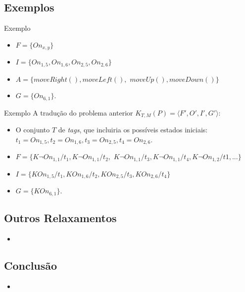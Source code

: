 \subsection{Exemplos}
\begin{frame}{Exemplo}
    \begin{multicols}{2}
        \centering
        
    \columnbreak
        \begin{itemize}
        \item $F = \lbrace On_{x,y} \rbrace$
        \item $I=\lbrace On_{1,5}, On_{1,6}, On_{2,5}, On_{2,6} \rbrace$
        \item $A=\lbrace moveRight(), moveLeft(),$ $moveUp(), moveDown() 
\rbrace$
        \item $G=\lbrace On_{6,1}\rbrace$.
        \end{itemize} 
    \end{multicols}
\end{frame}

\begin{frame}{Exemplo}
    A tradução do problema anterior $K_{T,M}(P) = \langle F', O', I', 
G'\rangle$:
    \begin{itemize}
    \item O conjunto $T$ de \textit{tags}, que incluiria os possíveis estados 
iniciais: 
    $t_1 = On_{1,5}, t_2 = On_{1,6}, t_3 = On_{2,5}, t_4 = On_{2,6}$.
    \item $F = \lbrace  K \lnot On_{1,1} / t_1, K \lnot On_{1,1} / t_2,$ 
    $ K \lnot On_{1,1} / t_3, K \lnot On_{1,1} / t_4, K \lnot On_{1,2} / t1,... 
\rbrace$
    \item $I=\lbrace K On_{1,5}/t_1, K On_{1,6}/t_2, K On_{2,5}/ t_3, K 
On_{2,6}/ t_4 \rbrace$
    \item $G=\lbrace K On_{6,1}\rbrace$.
    \end{itemize}
\end{frame}



\subsection{Outros Relaxamentos}
\begin{frame}
    \begin{itemize}
        \item
    \end{itemize}
\end{frame} 

\subsection{Conclusão}
\begin{frame}
    \begin{itemize}
        \item 
    \end{itemize}
\end{frame} 
